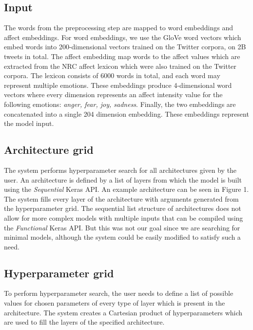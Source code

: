 \documentclass[10pt, a4paper]{article}
\begin{document}
\subsection{Input}
The words from the preprocessing step are mapped to word embeddings
and affect embeddings.
For word embeddings, we use the GloVe word vectors \citep{glove} 
which embed words into 200-dimensional vectors trained on the Twitter corpora,
on 2B tweets in total.
The affect embedding map words to the affect values which are
extracted from the NRC affect lexicon \citep{mohammed-semeval}
which were also trained on the Twitter corpora. The lexicon consists of 6000 words in total, and each word may represent multiple emotions.
These embeddings produce 4-dimensional word vectors where every
dimension represents an affect intensity value for the following emotions: \textit{anger, fear, joy, sadness}.
Finally, the two embeddings are concatenated into a single 204 dimension embedding.
These embeddings represent the model input.

\subsection{Architecture grid}
The system performs hyperparameter search for all architectures
given by the user. 
An architecture is defined by a list of layers from which
the model is built using the \textit{Sequential} Keras API.
An example architecture can be seen in Figure 1.
The system fills every layer of the architecture with
arguments generated from the hyperparameter grid.
The sequential list structure of architectures does not
allow for more complex models with multiple inputs that can be
compiled using the \textit{Functional} Keras API.
But this was not our goal since we are searching for minimal models, 
although the system could be easily modified to satisfy such a need.

\subsection{Hyperparameter grid}
To perform hyperparameter search, the user needs to define
a list of possible values for chosen parameters of every type
of layer which is present in the architecture.
The system creates a Cartesian product of hyperparameters
which are used to fill the layers of the specified architecture.
\end{document}
